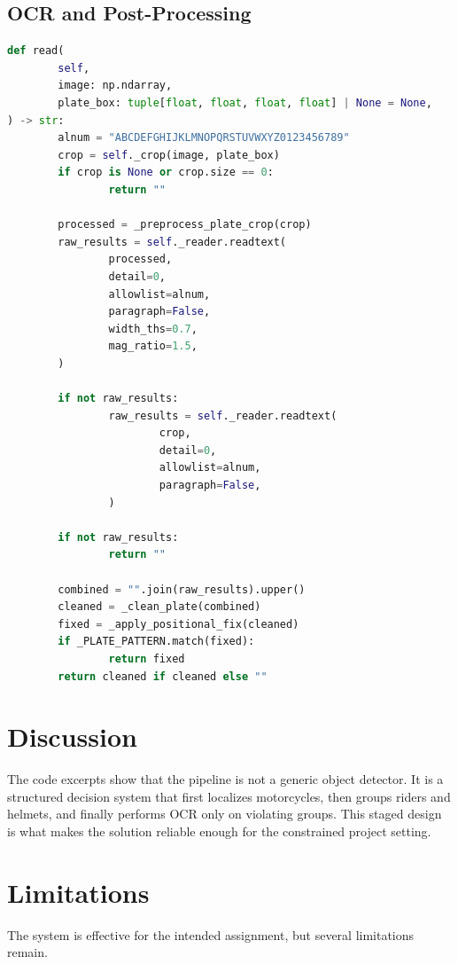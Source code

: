 \documentclass[conference]{IEEEtran}
\begin{document}
\subsection{OCR and Post-Processing}
\begin{lstlisting}[style=codeblock,language=Python,caption={Plate OCR preprocessing and cleanup in ocr.py},label={lst:ocr}]
def read(
        self,
        image: np.ndarray,
        plate_box: tuple[float, float, float, float] | None = None,
) -> str:
        alnum = "ABCDEFGHIJKLMNOPQRSTUVWXYZ0123456789"
        crop = self._crop(image, plate_box)
        if crop is None or crop.size == 0:
                return ""

        processed = _preprocess_plate_crop(crop)
        raw_results = self._reader.readtext(
                processed,
                detail=0,
                allowlist=alnum,
                paragraph=False,
                width_ths=0.7,
                mag_ratio=1.5,
        )

        if not raw_results:
                raw_results = self._reader.readtext(
                        crop,
                        detail=0,
                        allowlist=alnum,
                        paragraph=False,
                )

        if not raw_results:
                return ""

        combined = "".join(raw_results).upper()
        cleaned = _clean_plate(combined)
        fixed = _apply_positional_fix(cleaned)
        if _PLATE_PATTERN.match(fixed):
                return fixed
        return cleaned if cleaned else ""
\end{lstlisting}

\section{Discussion}
The code excerpts show that the pipeline is not a generic object detector. It is a structured decision system that first localizes motorcycles, then groups riders and helmets, and finally performs OCR only on violating groups. This staged design is what makes the solution reliable enough for the constrained project setting.

\section{Limitations}
The system is effective for the intended assignment, but several limitations remain.
\end{document}
